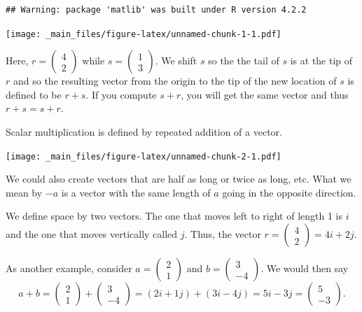 \documentclass[
]{book}
\theoremstyle{definition}
\theoremstyle{definition}
\theoremstyle{definition}
\theoremstyle{definition}
\theoremstyle{remark}
\begin{document}
\begin{verbatim}
## Warning: package 'matlib' was built under R version 4.2.2
\end{verbatim}

\texttt{[image: \_main\_files/figure-latex/unnamed-chunk-1-1.pdf]}

Here, \(r = \begin{pmatrix}4\\2 \end{pmatrix}\) while \(s = \begin{pmatrix} 1 \\ 3 \end{pmatrix}\). We shift \(s\) so the the tail of \(s\) is at the tip of \(r\) and so the resulting vector from the origin to the tip of the new location of \(s\) is defined to be \(r + s\). If you compute \(s + r\), you will get the same vector and thus \(r+s=s+r\).

Scalar multiplication is defined by repeated addition of a vector.

\texttt{[image: \_main\_files/figure-latex/unnamed-chunk-2-1.pdf]}

We could also create vectors that are half as long or twice as long, etc. What we mean by \(-a\) is a vector with the same length of \(a\) going in the opposite direction.

We define space by two vectors. The one that moves left to right of length 1 is \(i\) and the one that moves vertically called \(j\). Thus, the vector \(r = \begin{pmatrix} 4\\2 \end{pmatrix} = 4i + 2j\).

As another example, consider \(a = \begin{pmatrix} 2\\1 \end{pmatrix}\) and \(b = \begin{pmatrix}3 \\-4\end{pmatrix}\). We would then say \[a + b = \begin{pmatrix} 2\\1 \end{pmatrix}+ \begin{pmatrix}3 \\-4\end{pmatrix} = (2i+1j) + (3i - 4j) = 5i-3j = \begin{pmatrix}5\\-3 \end{pmatrix}.\]
\end{document}
